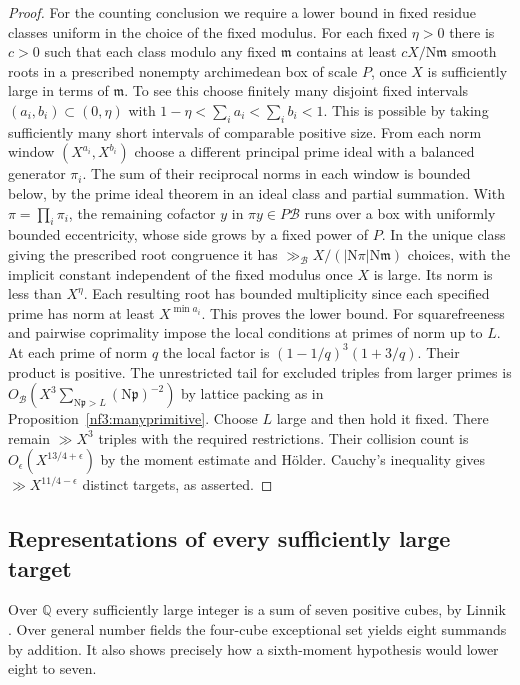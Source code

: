 \documentclass[11pt,letterpaper]{article}
\theoremstyle{definition}
\numberwithin{equation}{section}
\begin{document}
\begin{proof}
For the counting conclusion we require a lower bound in fixed residue
classes uniform in the choice of the fixed modulus. For each fixed
$\eta>0$ there is $c>0$ such that each class modulo any fixed
$\mathfrak m$ contains at least $cX/\mathrm N\mathfrak m$ smooth
roots in a prescribed nonempty archimedean box of scale $P$, once
$X$ is sufficiently large in terms of $\mathfrak m$. To see this
choose finitely many disjoint fixed intervals $(a_i,b_i)\subset
(0,\eta)$ with $1-\eta<\sum_i a_i<\sum_i b_i<1$.
This is possible by taking sufficiently many short intervals of
comparable positive size. From each norm window $(X^{a_i},X^{b_i})$
choose a different principal prime ideal with a balanced generator
$\pi_i$. The sum of their reciprocal norms in each window is
bounded below, by the prime ideal theorem in an ideal class and
partial summation. With $\pi=\prod_i\pi_i$, the remaining cofactor
$y$ in $\pi y\in P\mathcal B$ runs over a box with uniformly bounded
eccentricity, whose side grows by a fixed power of $P$. In the
unique class giving the prescribed root congruence it has
$\gg_{\mathcal B}X/(|\mathrm N\pi|\mathrm N\mathfrak m)$
choices, with the implicit constant independent of the fixed
modulus once $X$ is large. Its norm is less than $X^\eta$.
Each resulting root has bounded multiplicity since each specified
prime has norm at least $X^{\min a_i}$. This proves the lower bound.
For squarefreeness and pairwise coprimality impose the local
conditions at primes of norm up to $L$. At each prime of norm $q$
the local factor is $(1-1/q)^3(1+3/q)$. Their product is positive.
The unrestricted tail for excluded triples from larger primes is
$O_{\mathcal B}(X^3\sum_{\mathrm N\mathfrak p>L} (\mathrm N\mathfrak p)^{-2})$
by lattice packing as in Proposition~\ref{nf3:manyprimitive}.
Choose $L$ large and then hold it fixed. There remain $\gg X^3$
triples with the required restrictions. Their collision count is
$O_{\epsilon}(X^{13/4+\epsilon})$ by the moment estimate and
H\"older. Cauchy's inequality gives $\gg X^{11/4-\epsilon}$
distinct targets, as asserted.
\end{proof}

\subsection{Representations of every sufficiently large target}\label{nf3:alllarge}
Over $\mathbb Q$ every sufficiently large integer is a sum of seven
positive cubes, by Linnik \cite{nf3:linnik}. Over general number fields
the four-cube exceptional set yields eight summands by addition. It also
shows precisely how a sixth-moment hypothesis would lower eight to seven.
\end{document}
